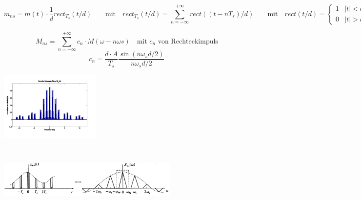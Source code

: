 	\begin{minipage}{18cm}
		\begin{equation*}
			m_{ns} = m(t)\cdot\frac{1}{d}rect_{T_s}(t/d) \qquad \text{mit} \quad rect_{T_s}(t/d) = \sum_{n=-\infty}^{+\infty}rect((t-nT_s)/d)\qquad \text{mit} \quad rect(t/d) = \begin{cases}
				1 & |t| < d/2\\
				0 & |t| > d/2
			\end{cases}
		\end{equation*}
	\end{minipage}
	
	\begin{minipage}{12cm}
		\begin{equation*}
			M_{ns} = \sum_{n=-\infty}^{+\infty}c_n \cdot M(\omega-n\omega s) \quad \text{mit $c_n$ von Rechteckimpuls}
		\end{equation*}
		\begin{equation*}
			c_n = \frac{d\cdot A}{T_s}\frac{\sin(n\omega_s d/2)}{n \omega_s d/2}
		\end{equation*}
	\end{minipage}
	\begin{minipage}{5cm}
			\includegraphics[width=5cm]{bilder/dig_naturalsampling_spektrum}
	\end{minipage}\\
	\begin{center}
		\begin{minipage}{9cm}
				\includegraphics[width=9cm]{bilder/dig_naturalsampling.png}
			\end{minipage}
	\end{center}
\newpage

